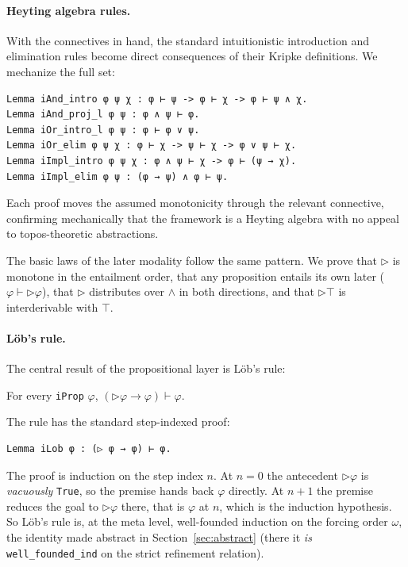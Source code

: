 \paragraph{Heyting algebra rules.}
With the connectives in hand, the standard intuitionistic
introduction and elimination rules become direct consequences of
their Kripke definitions.  We mechanize the full set:

\begin{lstlisting}
Lemma iAnd_intro φ ψ χ : φ ⊢ ψ -> φ ⊢ χ -> φ ⊢ ψ ∧ χ.
Lemma iAnd_proj_l φ ψ : φ ∧ ψ ⊢ φ.
Lemma iOr_intro_l φ ψ : φ ⊢ φ ∨ ψ.
Lemma iOr_elim φ ψ χ : φ ⊢ χ -> ψ ⊢ χ -> φ ∨ ψ ⊢ χ.
Lemma iImpl_intro φ ψ χ : φ ∧ ψ ⊢ χ -> φ ⊢ (ψ → χ).
Lemma iImpl_elim φ ψ : (φ → ψ) ∧ φ ⊢ ψ.
\end{lstlisting}

\noindent
Each proof moves the assumed monotonicity through the relevant
connective, confirming mechanically that the framework is a Heyting
algebra with no appeal to topos-theoretic abstractions.

The basic laws of the later modality follow the same pattern.  We
prove that $\triangleright$ is monotone in the entailment order,
that any proposition entails its own later
($\varphi \vdash \triangleright \varphi$), that $\triangleright$
distributes over $\wedge$ in both directions, and that
$\triangleright \top$ is interderivable with $\top$.

\paragraph{Löb's rule.}
The central result of the propositional layer is Löb's rule:
\begin{theorem}
For every \texttt{iProp} $\varphi$, $(\triangleright \varphi \to
\varphi) \vdash \varphi$.
\end{theorem}

\noindent
The rule has the standard step-indexed proof:

\begin{lstlisting}
Lemma iLob φ : (▷ φ → φ) ⊢ φ.
\end{lstlisting}

\noindent
The proof is induction on the step index $n$.  At $n = 0$ the
antecedent $\triangleright \varphi$ is \emph{vacuously} \texttt{True},
so the premise hands back $\varphi$ directly.  At $n+1$ the premise
reduces the goal to $\triangleright \varphi$ there, that is $\varphi$
at $n$, which is the induction hypothesis.  So Löb's rule is, at the
meta level, well-founded induction on the forcing order $\omega$, the
identity made abstract in Section~\ref{sec:abstract} (there it
\emph{is} \texttt{well\_founded\_ind} on the strict refinement
relation).

